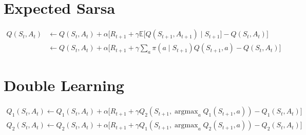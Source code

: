 \documentclass{article}
\DeclareMathOperator*{\argmax}{argmax}
\begin{document}
\section{Expected Sarsa}

    \begin{equation}
    \begin{split}
        Q(S_t, A_t) & \leftarrow Q(S_t, A_t) + \alpha \Big[ R_{t+1} + \gamma \mathbb{E} \big[ Q(S_{t+1}, A_{t+1}) \mid S_{t+1} \big] - Q(S_t, A_t) \Big] \\
        & \leftarrow Q(S_t, A_t) + \alpha \Big[ R_{t+1} + \gamma \sum_a \pi(a \mid S_{t+1}) Q(S_{t+1},a) - Q(S_t, A_t) \Big]
    \end{split}
    \end{equation}
    
\section{Double Learning}

    \begin{equation}
    \begin{split}
        Q_{1}(S_t, A_t) \leftarrow Q_{1}(S_t, A_t) + \alpha \Big[ R_{t+1} + \gamma Q_{2}(S_{t+1}, \argmax_a Q_{1}(S_{t+1}, a)) - Q_{1}(S_t, A_t) \Big] \\
        Q_{2}(S_t, A_t) \leftarrow Q_{2}(S_t, A_t) + \alpha \Big[ R_{t+1} + \gamma Q_{1}(S_{t+1}, \argmax_a Q_{2}(S_{t+1}, a)) - Q_{2}(S_t, A_t) \Big]
    \end{split}
    \end{equation}
    
\end{document}
